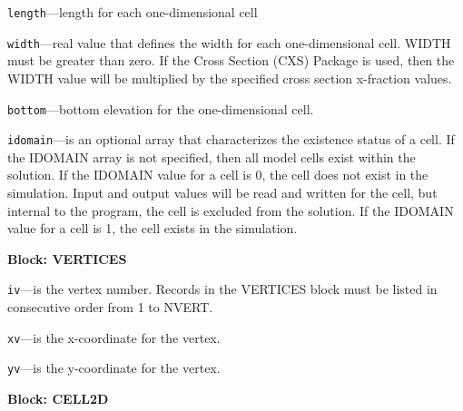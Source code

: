 \begin{description}
\item \texttt{length}---length for each one-dimensional cell

\item \texttt{width}---real value that defines the width for each one-dimensional cell. WIDTH must be greater than zero.  If the Cross Section (CXS) Package is used, then the WIDTH value will be multiplied by the specified cross section x-fraction values.

\item \texttt{bottom}---bottom elevation for the one-dimensional cell.

\item \texttt{idomain}---is an optional array that characterizes the existence status of a cell.  If the IDOMAIN array is not specified, then all model cells exist within the solution.  If the IDOMAIN value for a cell is 0, the cell does not exist in the simulation.  Input and output values will be read and written for the cell, but internal to the program, the cell is excluded from the solution.  If the IDOMAIN value for a cell is 1, the cell exists in the simulation.

\end{description}
\item \textbf{Block: VERTICES}

\begin{description}
\item \texttt{iv}---is the vertex number.  Records in the VERTICES block must be listed in consecutive order from 1 to NVERT.

\item \texttt{xv}---is the x-coordinate for the vertex.

\item \texttt{yv}---is the y-coordinate for the vertex.

\end{description}
\item \textbf{Block: CELL2D}

